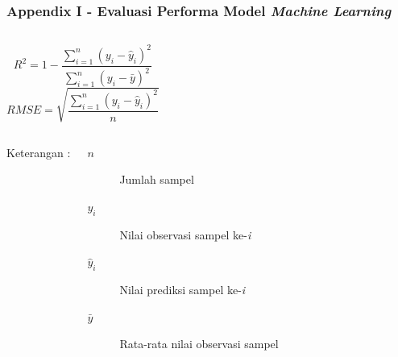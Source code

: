 \documentclass[8pt]{beamer}
\begin{document}
\begin{frame}
  \frametitle{Appendix I - Evaluasi Performa Model \textit{Machine Learning}}
  \begin{columns}[T]
\begin{equation}
\label{eq:r2}
  R^2 = 1 - \frac{\sum_{i=1}^{n}(y_i-\hat{y}_i)^2}{\sum_{i=1}^{n}(y_i-\bar{y})^2}
\end{equation}
\begin{equation}
\label{eq:rmse}
    RMSE = \sqrt{\frac{\sum_{i=1}^{n}(y_i-\hat{y}_i)^2}{n}}
\end{equation}
  \end{columns}
  \begin{columns}[T]
    \center Keterangan :
    \begin{description}
  \item[$n$] Jumlah sampel
  \item[$y_i$] Nilai observasi sampel ke-\textit{i}
  \item[$\hat{y}_i$] Nilai prediksi sampel ke-\textit{i}
  \item[$\bar{y}$] Rata-rata nilai observasi sampel
    \end{description}
  \end{columns}
\end{frame}
\end{document}
